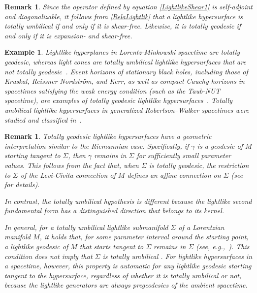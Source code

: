 \documentclass[11pt]{article}
\numberwithin{equation}{section}
\newtheorem{remark}[theorem]{Remark}
\newtheorem{example}[theorem]{Example}
\begin{document}
	\begin{remark}\normalfont
		Since the operator defined by equation \eqref{LightlikeShear1} is self-adjoint and diagonalizable, it follows from \eqref{RelaLightlik} that a lightlike hypersurface is totally umbilical if and only if it is shear-free.  Likewise, it is totally geodesic if and only if it is expansion- and shear-free.
	\end{remark}
	
\begin{example}
	\normalfont
	Lightlike hyperplanes in Lorentz-Minkowski spacetime are totally geodesic, whereas light cones are totally umbilical lightlike hypersurfaces that are not totally geodesic~\cite{Bejancu1996}. Event horizons of stationary black holes, including those of Kruskal, Reissner-Nordström, and Kerr, as well as compact Cauchy horizons in spacetimes satisfying the weak energy condition (such as the Taub-NUT spacetime), are examples of totally geodesic lightlike hypersurfaces~\cite[p.~323]{HawkingEllis}. Totally umbilical lightlike hypersurfaces in generalized Robertson--Walker spacetimes were studied and classified in~\cite{gutierrez15}.
\end{example}
	
	
\begin{remark}\label{remark:TU_Hyper} \normalfont
		Totally geodesic lightlike hypersurfaces have a geometric interpretation similar to the Riemannian case. Specifically, if $\gamma$ is a geodesic of $M$ starting tangent to $\Sigma$, then $\gamma$ remains in $\Sigma$ for sufficiently small parameter values. This follows from the fact that, when $\Sigma$ is totally geodesic, the restriction to $\Sigma$ of the Levi-Civita connection of $M$ defines an affine connection on $\Sigma$ (see~\cite{kupeli87} for details).
	
	In contrast, the totally umbilical hypothesis is different because the lightlike second fundamental form has a distinguished direction that belongs to its kernel.
	
In general, for a totally umbilical lightlike submanifold $\Sigma$ of a Lorentzian manifold $M$, it holds that, for some parameter interval around the starting point, a lightlike geodesic of $M$ that starts tangent to $\Sigma$ remains in $\Sigma$ (see, e.g.,~\cite[Prop.~3.4.3]{Duggal_Sahin}). This condition does not imply that $\Sigma$ is totally umbilical \cite{Perlick}. For lightlike hypersurfaces in a spacetime, however, this property is automatic for any lightlike geodesic starting tangent to the hypersurface, regardless of whether it is totally umbilical or not, because the lightlike generators are always pregeodesics of the ambient spacetime.
\end{remark}
 
\end{document}
